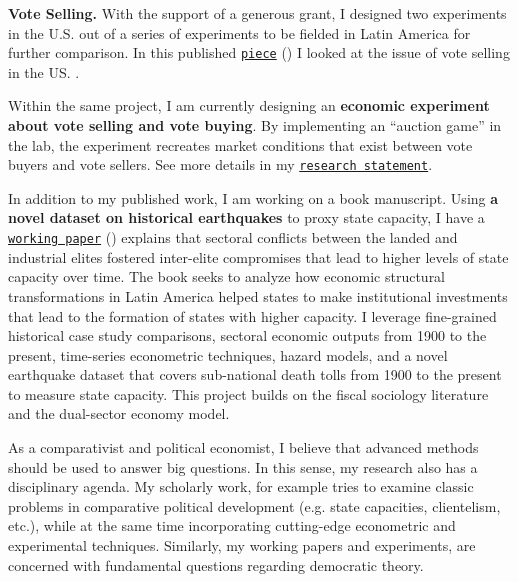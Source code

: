 {\bf Vote Selling.} With the support of a generous grant, I designed two experiments in the U.S. out of a series of experiments to be fielded in Latin America for further comparison. In this published \href{https://github.com/hbahamonde/Vote_Selling/raw/master/Bahamonde_VoteSellingUS.pdf}{\texttt{piece}} (\emph{\unskip}) I looked at the issue of vote selling in the US. .

Within the same project, I am currently designing an {\bf economic experiment about vote selling and vote buying}. By implementing an ``auction game'' in the lab, the experiment recreates market conditions that exist between vote buyers and vote sellers. See more details in my \href{http://github.com/hbahamonde/Job_Market/raw/master/Bahamonde_Research_Statement.pdf}{\texttt{research statement}}.


In addition to my published work, I am working on a book manuscript. Using {\bf a novel dataset on historical earthquakes} to proxy state capacity, I have a \href{https://github.com/hbahamonde/Earthquake_Paper/raw/master/Bahamonde_Earthquake_Paper.pdf}{\texttt{working paper}} (\emph{\unskip}) explains that sectoral conflicts between the landed and industrial elites fostered inter-elite compromises that lead to higher levels of state capacity over time. The book seeks to analyze how economic structural transformations in Latin America helped states to make institutional investments that lead to the formation of states with higher capacity. I leverage fine-grained historical case study comparisons, sectoral economic outputs from 1900 to the present, time-series econometric techniques, hazard models, and a novel earthquake dataset that covers sub-national death tolls from 1900 to the present to measure state capacity. This project builds on the fiscal sociology literature and the dual-sector economy model. 


As a comparativist and political economist, I believe that advanced methods should be used to answer big questions. In this sense, my research also has a disciplinary agenda. My scholarly work, for example tries to examine classic problems in comparative political development (e.g. state capacities, clientelism, etc.), while at the same time incorporating cutting-edge econometric and experimental techniques. Similarly, my working papers and experiments, are concerned with fundamental questions regarding democratic theory.